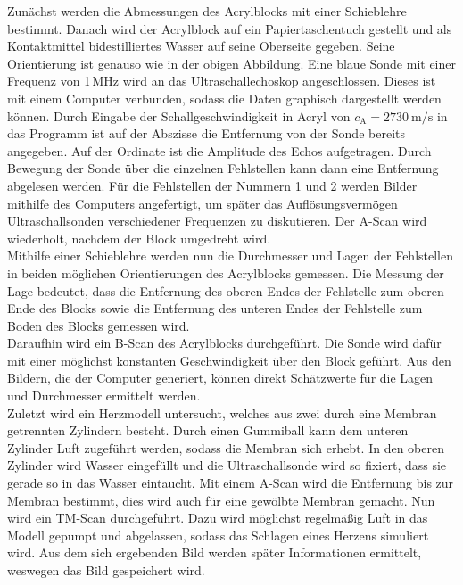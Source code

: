 Zunächst werden die Abmessungen des Acrylblocks mit einer Schieblehre bestimmt.
Danach wird der Acrylblock auf ein Papiertaschentuch gestellt und als Kontaktmittel
bidestilliertes Wasser auf seine Oberseite gegeben. Seine Orientierung ist genauso wie in
der obigen Abbildung. Eine blaue Sonde mit einer Frequenz von 1\,MHz wird an das
Ultraschallechoskop angeschlossen. Dieses ist mit einem Computer verbunden, sodass
die Daten graphisch dargestellt werden können. Durch Eingabe der Schallgeschwindigkeit
in Acryl von $c_\text{A} = \SI{2730}{\meter\per\second}$ in das Programm ist auf der Abszisse die
Entfernung von der Sonde bereits angegeben. Auf der Ordinate ist die Amplitude des Echos
aufgetragen. Durch Bewegung der Sonde über die einzelnen Fehlstellen kann dann eine
Entfernung abgelesen werden. Für die Fehlstellen der Nummern 1 und 2 werden Bilder mithilfe
des Computers angefertigt, um später das Auflösungsvermögen Ultraschallsonden verschiedener
Frequenzen zu diskutieren. Der A-Scan wird wiederholt, nachdem der Block umgedreht wird.\\
Mithilfe einer Schieblehre werden nun die Durchmesser und Lagen der Fehlstellen in beiden
möglichen Orientierungen des Acrylblocks gemessen. Die Messung der Lage bedeutet, dass
die Entfernung des oberen Endes der Fehlstelle zum oberen Ende des Blocks sowie die
Entfernung des unteren Endes der Fehlstelle zum Boden des Blocks gemessen wird.\\
Daraufhin wird ein B-Scan des Acrylblocks durchgeführt. Die Sonde wird dafür mit einer
möglichst konstanten Geschwindigkeit über den Block geführt. Aus den Bildern, die
der Computer generiert, können direkt Schätzwerte für die Lagen und Durchmesser ermittelt werden.\\
Zuletzt wird ein Herzmodell untersucht, welches aus zwei durch eine Membran getrennten Zylindern
besteht. Durch einen Gummiball kann dem unteren Zylinder Luft zugeführt werden, sodass die Membran
sich erhebt. In den oberen Zylinder wird Wasser eingefüllt und die Ultraschallsonde
wird so fixiert, dass sie gerade so in das Wasser eintaucht. Mit einem A-Scan wird die
Entfernung bis zur Membran bestimmt, dies wird auch für eine gewölbte Membran gemacht.
Nun wird ein TM-Scan durchgeführt. Dazu wird möglichst regelmäßig Luft in das Modell
gepumpt und abgelassen, sodass das Schlagen eines Herzens simuliert wird. Aus dem
sich ergebenden Bild werden später Informationen ermittelt, weswegen das Bild gespeichert wird.
